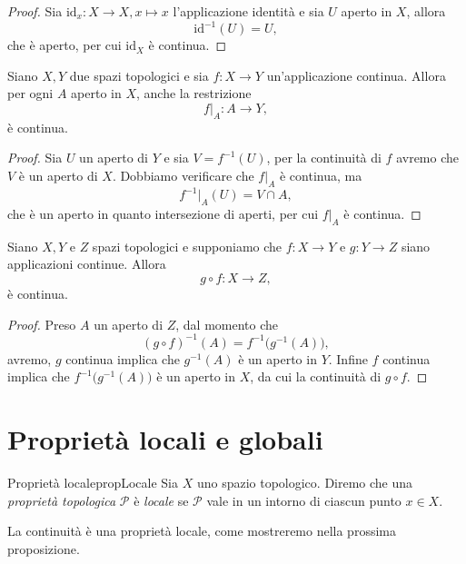 \begin{proof}
	Sia \(\mathrm{id}_x\colon X\to X,x\mapsto x\) l'applicazione identità e sia \(U\) aperto in \(X\), allora
	\[
		\mathrm{id}^{-1}(U)=U,
	\]
	che è aperto, per cui \(\mathrm{id}_X\) è continua.
\end{proof}

\begin{lem}\label{lm:cont3}
	Siano \(X,Y\) due spazi topologici e sia \(f\colon X\to Y\) un'applicazione continua.
	Allora per ogni \(A\) aperto in \(X\), anche la restrizione
	\[
		f|_A\colon A\to Y,
	\]
	è continua.
\end{lem}

\begin{proof}
	Sia \(U\) un aperto di \(Y\) e sia \(V=f^{-1}(U)\), per la continuità di \(f\) avremo che \(V\) è un aperto di \(X\).
	Dobbiamo verificare che \(f|_A\) è continua, ma
	\[
		f^{-1}|_A(U)=V\cap A,
	\]
	che è un aperto in quanto intersezione di aperti, per cui \(f|_A\) è continua.
\end{proof}

\begin{lem}\label{lm:cont4}
	Siano \(X,Y\) e \(Z\) spazi topologici e supponiamo che \(f\colon X\to Y\) e \(g\colon Y\to Z\) siano applicazioni continue.
	Allora
	\[
		g\circ f\colon X\to Z,
	\]
	è continua.
\end{lem}

\begin{proof}
	Preso \(A\) un aperto di \(Z\), dal momento che
	\[
		(g\circ f)^{-1}(A)=f^{-1}\big(g^{-1}(A)\big),
	\]
	avremo, \(g\) continua implica che \(g^{-1}(A)\) è un aperto in \(Y\).
	Infine \(f\) continua implica che \(f^{-1}\big(g^{-1}(A)\big)\) è un aperto in \(X\), da cui la continuità di \(g\circ f\).
\end{proof}
\section{Proprietà locali e globali}

\begin{defn}{Proprietà locale}{propLocale}
	Sia \(X\) uno spazio topologico.
	Diremo che una \emph{proprietà topologica} \(\mathcal{P}\) è \emph{locale} se \(\mathcal{P}\) vale in un intorno di ciascun punto \(x\in X\).
\end{defn}

\begin{ese}
	La continuità è una proprietà locale, come mostreremo nella prossima proposizione.
\end{ese}

